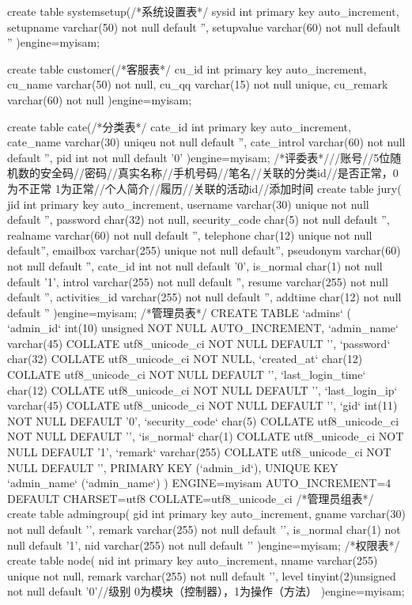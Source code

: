 create table systemsetup(/*系统设置表*/
sysid int primary key auto_increment,
setupname varchar(50) not null default '',
setupvalue varchar(60) not null default ''
)engine=myisam;

create table customer(/*客服表*/
cu_id int primary key  auto_increment,
cu_name varchar(50) not null,
cu_qq varchar(15) not null unique,
cu_remark varchar(60) not null
)engine=myisam;

create table cate(/*分类表*/
cate_id int primary key auto_increment,
cate_name varchar(30) uniqeu not null default '',
cate_introl varchar(60) not null default '',
pid int not null default '0'
)engine=myisam;
/*评委表*///账号//5位随机数的安全码//密码//真实名称//手机号码//笔名//关联的分类id//是否正常，0为不正常 1为正常//个人简介//履历//关联的活动id//添加时间
create table jury(
jid int primary key auto_increment,
username varchar(30) unique not null  default '',
password char(32) not null,
security_code char(5) not null default '',
realname varchar(60) not null default '',
telephone char(12)  unique not null default'',
emailbox varchar(255) unique not null default'',
pseudonym varchar(60) not null default '',
cate_id int not null default '0',
is_normal char(1) not null default '1',
introl varchar(255) not null default '',
resume varchar(255) not null default '',
activities_id varchar(255) not null default '',
addtime char(12) not null default ''
)engine=myisam;
/*管理员表*/
CREATE TABLE `admins` (
  `admin_id` int(10) unsigned NOT NULL AUTO_INCREMENT,
  `admin_name` varchar(45) COLLATE utf8_unicode_ci NOT NULL DEFAULT '',
  `password` char(32) COLLATE utf8_unicode_ci NOT NULL,
  `created_at` char(12) COLLATE utf8_unicode_ci NOT NULL DEFAULT '',
  `last_login_time` char(12) COLLATE utf8_unicode_ci NOT NULL DEFAULT '',
  `last_login_ip` varchar(45) COLLATE utf8_unicode_ci NOT NULL DEFAULT '',
  `gid` int(11) NOT NULL DEFAULT '0',
  `security_code` char(5) COLLATE utf8_unicode_ci NOT NULL DEFAULT '',
  `is_normal` char(1) COLLATE utf8_unicode_ci NOT NULL DEFAULT '1',
  `remark` varchar(255) COLLATE utf8_unicode_ci NOT NULL DEFAULT '',
  PRIMARY KEY (`admin_id`),
  UNIQUE KEY `admin_name` (`admin_name`)
) ENGINE=myisam AUTO_INCREMENT=4 DEFAULT CHARSET=utf8 COLLATE=utf8_unicode_ci
/*管理员组表*/
create table admingroup(
gid int primary key auto_increment,
gname varchar(30) not null default '',
remark varchar(255) not null default '',
is_normal char(1) not null default '1',
nid varchar(255) not null default ''
)engine=myisam;
/*权限表*/
create table node(
nid int primary key auto_increment,
nname varchar(255) unique not null,
remark varchar(255) not null default '',
level tinyint(2)unsigned not null default '0'//级别 0为模块（控制器），1为操作（方法）
)engine=myisam;